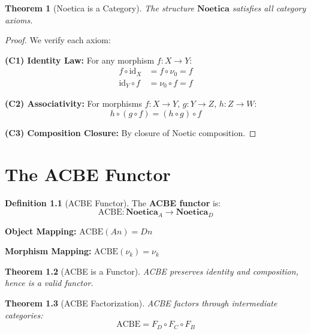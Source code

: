 \documentclass[11pt,twoside,openright]{book}
\theoremstyle{definition}
\newtheorem{definition}{Definition}[chapter]
\theoremstyle{plain}
\newtheorem{theorem}[definition]{Theorem}
\theoremstyle{remark}
\newcommand{\Noetica}{\mathbf{Noetica}}
\newcommand{\noe}[1]{\nu_{#1}}
\newcommand{\id}{\mathrm{id}}
\begin{document}
\begin{theorem}[Noetica is a Category]
\label{thm:noetica-category}
The structure $\Noetica$ satisfies all category axioms.
\end{theorem}

\begin{proof}
We verify each axiom:

\textbf{(C1) Identity Law:}
For any morphism $f : X \to Y$:
\begin{align}
f \circ \id_X &= f \circ \noe{0} = f \\
\id_Y \circ f &= \noe{0} \circ f = f
\end{align}

\textbf{(C2) Associativity:}
For morphisms $f : X \to Y$, $g : Y \to Z$, $h : Z \to W$:
\[
h \circ (g \circ f) = (h \circ g) \circ f
\]

\textbf{(C3) Composition Closure:}
By closure of Noetic composition.
\end{proof}

\chapter{The ACBE Functor}
\label{ch:acbe-functor}

\begin{definition}[ACBE Functor]
\label{def:acbe-functor}
The \textbf{ACBE functor} is:
\[
\mathrm{ACBE} : \Noetica_A \to \Noetica_D
\]

\textbf{Object Mapping:}
$\mathrm{ACBE}(An) = Dn$

\textbf{Morphism Mapping:}
$\mathrm{ACBE}(\noe{k}) = \noe{k}$
\end{definition}

\begin{theorem}[ACBE is a Functor]
\label{thm:acbe-functor}
ACBE preserves identity and composition, hence is a valid functor.
\end{theorem}

\begin{theorem}[ACBE Factorization]
\label{thm:acbe-factor}
ACBE factors through intermediate categories:
\[
\mathrm{ACBE} = F_D \circ F_C \circ F_B
\]
\end{theorem}

\end{document}
